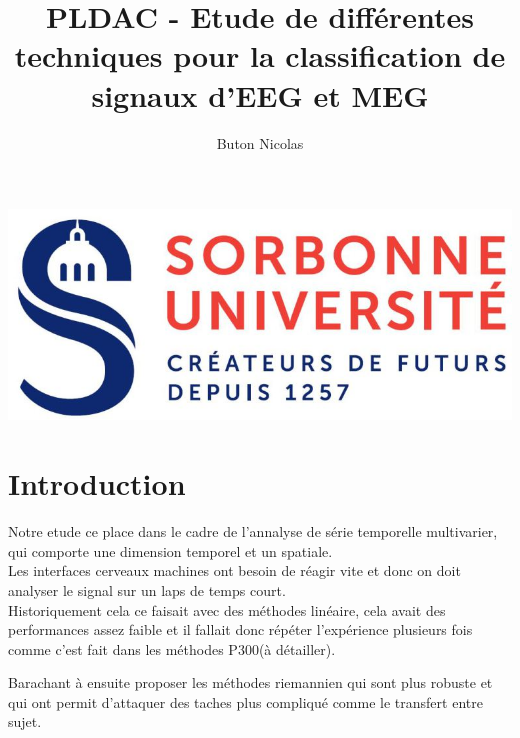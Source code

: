 \documentclass{article}
\title{PLDAC - Etude de différentes techniques pour la classification de signaux d'EEG et MEG}
\author{Buton Nicolas}
\begin{document}
\maketitle
\begin{center}
\includegraphics[scale=1]{images/logoSorbonne.jpg}
\end{center}
\newpage
\tableofcontents
\newpage
{}
\part{Introduction}
Notre etude ce place dans le cadre de l'annalyse de série temporelle multivarier, qui comporte une dimension temporel et un spatiale.\\

Les interfaces cerveaux machines ont besoin de réagir vite et donc on doit analyser le signal sur un laps de temps court.\\

Historiquement cela ce faisait avec des méthodes linéaire, cela avait des performances assez faible et il fallait donc répéter l’expérience plusieurs fois comme c'est fait dans les méthodes P300(à détailler).

Barachant à ensuite proposer les méthodes riemannien qui sont plus robuste et qui ont permit d'attaquer des taches plus compliqué comme le transfert entre sujet.\\
\end{document}
